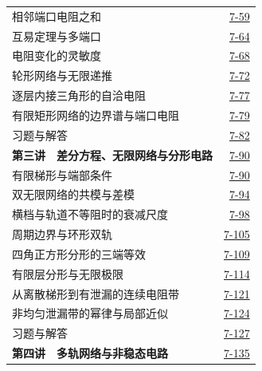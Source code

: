 \begin{longtable}{@{}p{}r@{}}
\hspace{1em}相邻端口电阻之和&\href{course-page:7:62}{7-59}\\[2pt]
\hspace{1em}互易定理与多端口&\href{course-page:7:67}{7-64}\\[2pt]
\hspace{1em}电阻变化的灵敏度&\href{course-page:7:71}{7-68}\\[2pt]
\hspace{1em}轮形网络与无限递推&\href{course-page:7:75}{7-72}\\[2pt]
\hspace{1em}逐层内接三角形的自洽电阻&\href{course-page:7:80}{7-77}\\[2pt]
\hspace{1em}有限矩形网络的边界谱与端口电阻&\href{course-page:7:82}{7-79}\\[2pt]
\hspace{1em}习题与解答&\href{course-page:7:85}{7-82}\\[2pt]
\textbf{第三讲　差分方程、无限网络与分形电路}&\href{course-page:7:93}{7-90}\\[2pt]
\hspace{1em}有限梯形与端部条件&\href{course-page:7:93}{7-90}\\[2pt]
\hspace{1em}双无限网络的共模与差模&\href{course-page:7:97}{7-94}\\[2pt]
\hspace{1em}横档与轨道不等阻时的衰减尺度&\href{course-page:7:101}{7-98}\\[2pt]
\hspace{1em}周期边界与环形双轨&\href{course-page:7:108}{7-105}\\[2pt]
\hspace{1em}四角正方形分形的三端等效&\href{course-page:7:112}{7-109}\\[2pt]
\hspace{1em}有限层分形与无限极限&\href{course-page:7:117}{7-114}\\[2pt]
\hspace{1em}从离散梯形到有泄漏的连续电阻带&\href{course-page:7:124}{7-121}\\[2pt]
\hspace{1em}非均匀泄漏带的幂律与局部近似&\href{course-page:7:127}{7-124}\\[2pt]
\hspace{1em}习题与解答&\href{course-page:7:130}{7-127}\\[2pt]
\textbf{第四讲　多轨网络与非稳态电路}&\href{course-page:7:138}{7-135}\\[2pt]

\end{longtable}
